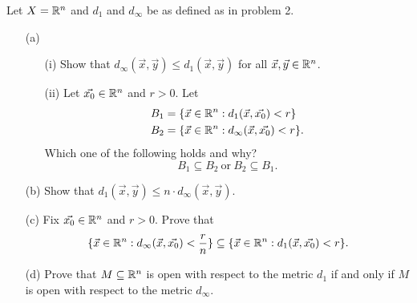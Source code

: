 \documentclass[a4paper]{article}
\begin{document}
\begin{problem}
    Let \( X = \mathbb{R}^{n} \) and \( {d}_{1} \) and \( {d}_{\infty } \) be as defined as in problem 2. 
    \begin{enumerate}
        \item[(a)] 
            \begin{enumerate}
                \item[(i)] Show that \( {d}_{\infty }(\vec{ x } , \vec{ y } ) \leq {d}_{1} (\vec{ x } , \vec{ y } ) \) for all \( \vec{ x } , \vec{ y } \in \mathbb{R}^{n} \).  
                \item[(ii)] Let \( \vec{ {x}_{0} } \in \mathbb{R}^{n} \) and \( r > 0  \). Let 
                    \begin{align*}
                        {B}_{1} &= \{ \vec{ x  }  \in \mathbb{R}^{n} : {d}_{1}(\vec{ x } , \vec{ {x}_{0} } ) < r \}  \\
                        {B}_{2} &= \{ \vec{ x } \in \mathbb{R}^{n} : {d}_{\infty }(\vec{ x } , \vec{ {x}_{0} } ) < r \}. 
                    \end{align*}
                    Which one of the following holds and why?
                    \[  {B}_{1} \subseteq {B}_{2} \ \text{or} \ {B}_{2} \subseteq {B}_{1}. \]
            \end{enumerate}
        \item[(b)] Show that \( {d}_{1}(\vec{ x } , \vec{ y } ) \leq n \cdot {d}_{\infty }(\vec{ x } , \vec{ y } ). \)
        \item[(c)] Fix \( \vec{ {x}_{0} }  \in \mathbb{R}^{n} \) and \( r > 0  \). Prove that 
            \[  \{ \vec{ x }  \in \mathbb{R}^{n} : {d}_{\infty }(\vec{ x } , \vec{ {x}_{0} } ) < \frac{ r  }{ n  }  \}  \subseteq  \{ \vec{ x }  \in \mathbb{R}^{n} : {d}_{1}(\vec{ x } , \vec{ {x}_{0} } ) < r  \}. \]
        \item[(d)] Prove that \( M \subseteq  \mathbb{R}^{n} \) is open with respect to the metric \( {d}_{1} \) if and only if \( M  \) is open with respect to the metric \( {d}_{\infty } \).
    \end{enumerate}
\end{problem}
\end{document}
